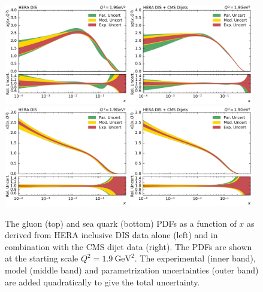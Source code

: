 \begin{figure}[tbp]
  \centering
  \includegraphics[width=0.48\textwidth]{figures/pdf_constraints/pdfcomp_HFTD_HERA_0_1.9.pdf}\hfill%
  \includegraphics[width=0.48\textwidth]{figures/pdf_constraints/pdfcomp_HFTD_HERACMSTDJETS_0_1.9.pdf}
  \includegraphics[width=0.48\textwidth]{figures/pdf_constraints/pdfcomp_HFTD_HERA_9_1.9.pdf}\hfill%
  \includegraphics[width=0.48\textwidth]{figures/pdf_constraints/pdfcomp_HFTD_HERACMSTDJETS_9_1.9.pdf}
  \caption[The gluon and sea quark PDFs]{The gluon (top) and sea quark (bottom) PDFs as a function of $x$ as
  derived from HERA inclusive DIS data alone (left) and in combination with
  the CMS dijet data (right). The PDFs are shown at the starting scale $Q^2 =
  \SI{1.9}{\GeV \squared}$. The experimental (inner band), model (middle band)
  and parametrization uncertainties (outer band) are added quadratically to give
  the total uncertainty.}
  \label{fig:pdfconstraints:split:gluonqsea:19}
\end{figure}

